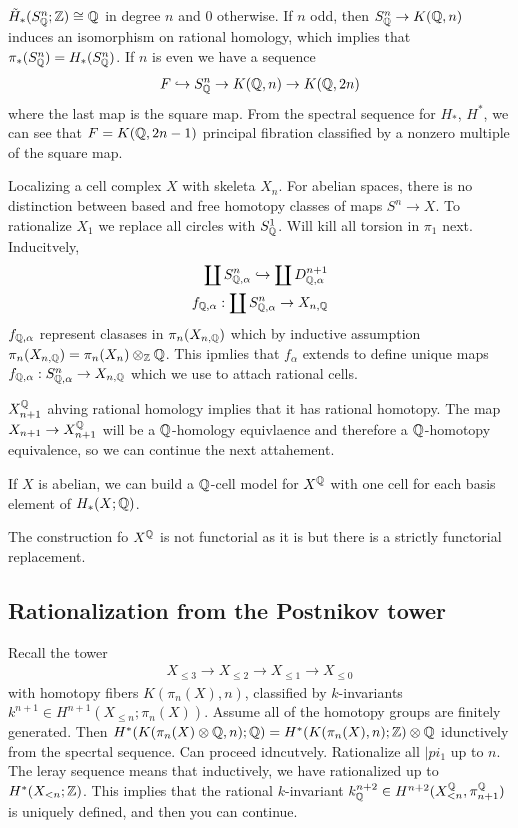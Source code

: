 \documentclass[12pt]{article}
\begin{document}
\begin{proposition}
    $\tilde{H}_*(S^n_{\mathbb{Q}};\mathbb{Z}) \cong \mathbb{Q}$ in degree $n$ and $0$ otherwise. If $n$ odd, then $S^n_{\mathbb{Q}} \to K(\mathbb{Q},n)$ induces an isomorphism on rational homology, which implies that $\pi_*(S^n_{\mathbb{Q}}) = H_*(S^n_{\mathbb{Q}})$. If $n$ is even we have a sequence \begin{align*}
        F\hookrightarrow S^n_{\mathbb{Q}} \to K(\mathbb{Q},n) \to K(\mathbb{Q},2n)
    \end{align*} where the last map is the square map. From the spectral sequence for $H_*$, $H^*$, we can see that $F = K(\mathbb{Q},2n-1)$ principal fibration classified by a nonzero multiple of the square map.
\end{proposition}
Localizing a cell complex $X$ with skeleta $X_n$. For abelian spaces, there is no distinction between based and free homotopy classes of maps $S^n\to X$. To rationalize $X_1$ we replace all circles with $S^1_{\mathbb{Q}}$. Will kill all torsion in $\pi_1$ next. Inducitvely, \begin{align*}
    \coprod S^n_{\mathbb{Q},\alpha} \hookrightarrow \coprod D^{n+1}_{\mathbb{Q},\alpha} \\
    f_{\mathbb{Q},\alpha}:\coprod S^n_{\mathbb{Q},\alpha} \to X_{n,\mathbb{Q}}
\end{align*} $f_{\mathbb{Q},\alpha}$ represent clasases in $\pi_n(X_{n,\mathbb{Q}})$ which by inductive assumption $\pi_n(X_{n,\mathbb{Q}}) = \pi_n(X_n)\otimes_{\mathbb{Z}} \mathbb{Q}$. This ipmlies that $f_\alpha$ extends to define unique maps $f_{\mathbb{Q},\alpha}:S^{n}_{\mathbb{Q},\alpha} \to X_{n,\mathbb{Q}}$ which we use to attach rational cells. 

$X_{n+1}^{\mathbb{Q}}$ ahving rational homology implies that it has rational homotopy. The map $X_{n+1} \to X_{n+1}^{\mathbb{Q}}$ will be a $\mathbb{Q}$-homology equivlaence and therefore a $\mathbb{Q}$-homotopy equivalence, so we can continue the next attahement.

\begin{remark}
    If $X$ is abelian, we can build a $\mathbb{Q}$-cell model for $X^{\mathbb{Q}}$ with one cell for each basis element of $H_*(X;\mathbb{Q})$.
\end{remark}

\begin{remark}
    The construction fo $X^{\mathbb{Q}}$ is not functorial as it is but there is a strictly functorial replacement.
\end{remark}

\subsection{Rationalization from the Postnikov tower}
Recall the tower \begin{align*}
    X_{\leq 3} \to X_{\leq 2} \to X_{\leq 1} \to X_{\leq 0}
\end{align*} with homotopy fibers $K(\pi_n(X),n)$, classified by $k$-invariants $k^{n+1} \in H^{n+1}(X_{\leq n};\pi_n(X))$. Assume all of the homotopy groups are finitely generated. Then $H^*(K(\pi_n(X)\otimes \mathbb{Q},n);\mathbb{Q}) = H^*(K(\pi_n(X),n);\mathbb{Z}) \otimes \mathbb{Q}$ idunctively from the specrtal sequence. Can proceed idncutvely. Rationalize all $|pi_1$ up to $n$. The leray sequence means that inductively, we have rationalized up to $H^*(X_{< n};\mathbb{Z})$. This implies that the rational $k$-invariant $k^{n+2}_{\mathbb{Q}} \in H^{n+2}(X_{<n}^{\mathbb{Q}},\pi_{n+1}^{\mathbb{Q}})$ is uniquely defined, and then you can continue.
\end{document}

